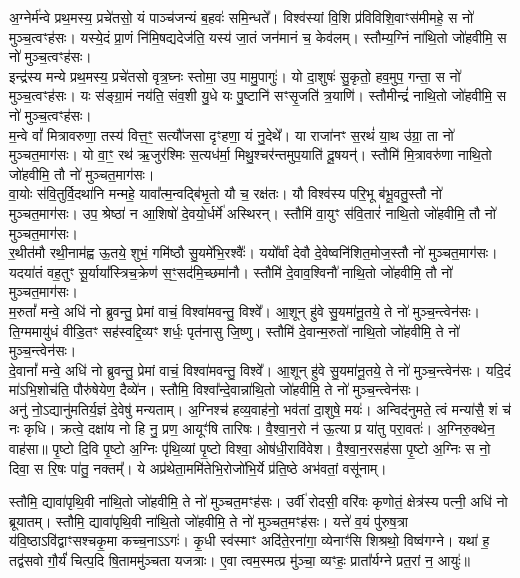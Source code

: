 अ॒ग्नेर्म॑न्वे प्रथ॒मस्य॒ प्रचे॑तसो॒ यं पाञ्च॑जन्यं ब॒हवः॑ समि॒न्धते᳚। विश्व॑स्यां वि॒शि प्र॑विविशि॒वाꣳस॑मीमहे॒ स नो॑ मुञ्च॒त्वꣳह॑सः। यस्ये॒दं प्रा॒णं नि॑मि॒षद्यदेज॑ति॒ यस्य॑ जा॒तं जन॑मानं च॒ केव॑लम्। स्तौम्य॒ग्निं ना॑थि॒तो जो॑हवीमि॒ स नो॑ मुञ्च॒त्वꣳह॑सः।\\
इन्द्र॑स्य मन्ये प्रथ॒मस्य॒ प्रचे॑तसो वृत्र॒घ्नः स्तोमा॒ उप॒ मामु॒पागुः॑। यो दा॒शुषः॑ सु॒कृतो॒ हव॒मुप॒ गन्ता॒ स नो॑ मुञ्च॒त्वꣳह॑सः। यः स॑ङ्ग्रा॒मं नय॑ति॒ संव॒शी यु॒धे यः पु॒ष्टानि॑ सꣳसृ॒जति॑ त्र॒याणि॑। स्तौमीन्द्रं॑ नाथि॒तो जो॑हवीमि॒ स नो॑ मुञ्च॒त्वꣳह॑सः।\\
म॒न्वे वां᳚ मित्रावरुणा॒ तस्य॑ वित्त॒ꣳ॒ सत्यौ॑जसा दृꣳहणा॒ यं नु॒देथे᳚। या राजा॑नꣳ स॒रथं॑ या॒थ उ॑ग्रा॒ ता नो॑ मुञ्चत॒माग॑सः। यो वा॒ꣳ॒ रथ॑ ऋ॒जुर॑श्मिः स॒त्यध॑र्मा॒ मिथु॒श्चर॑न्तमुप॒याति॑ दू॒षयन्॑। स्तौमि॑ मि॒त्रावरु॑णा नाथि॒तो जो॑हवीमि॒ तौ नो॑ मुञ्चत॒माग॑सः।\\
वा॒योः स॑वि॒तुर्वि॒दथा॑नि मन्महे॒ यावा᳚त्म॒न्वद्बि॑भृ॒तो यौ च॒ रक्ष॑तः। यौ विश्व॑स्य परि॒भू ब॑भू॒वतु॒स्तौ नो॑ मुञ्चत॒माग॑सः। उप॒ श्रेष्ठा॑ न आ॒शिषो॑ दे॒वयो॒र्धर्मे॑ अस्थिरन्। स्तौमि॑ वा॒युꣳ स॑वि॒तारं॑ नाथि॒तो जो॑हवीमि॒ तौ नो॑ मुञ्चत॒माग॑सः।\\
र॒थीत॑मौ रथी॒नाम॑ह्व ऊ॒तये॒ शुभं॒ गमि॑ष्ठौ सु॒यमे॑भि॒रश्वैः᳚। ययो᳚र्वां देवौ दे॒वेष्वनि॑शित॒मोज॒स्तौ नो॑ मुञ्चत॒माग॑सः। यदया॑तं वह॒तुꣳ सू॒र्याया᳚स्त्रिच॒क्रेण॑ स॒ꣳ॒सद॑मि॒च्छमा॑नौ। स्तौमि॑ दे॒वाव॒श्विनौ॑ नाथि॒तो जो॑हवीमि॒ तौ नो॑ मुञ्चत॒माग॑सः।\\
म॒रुतां᳚ मन्वे॒ अधि॑ नो ब्रुवन्तु॒ प्रेमां वाचं॒ विश्वा॑मवन्तु॒ विश्वे᳚। आ॒शून् हु॑वे सु॒यमा॑नू॒तये॒ ते नो॑ मुञ्च॒न्त्वेन॑सः। ति॒ग्ममायु॑धं वीडि॒तꣳ सह॑स्वद्दि॒व्यꣳ शर्धः॒ पृत॑नासु जि॒ष्णु। स्तौमि॑ दे॒वान्म॒रुतो॑ नाथि॒तो जो॑हवीमि॒ ते नो॑ मुञ्च॒न्त्वेन॑सः।\\
दे॒वानां᳚ मन्वे॒ अधि॑ नो ब्रुवन्तु॒ प्रेमां वाचं॒ विश्वा॑मवन्तु॒ विश्वे᳚। आ॒शून् हु॑वे सु॒यमा॑नू॒तये॒ ते नो॑ मुञ्च॒न्त्वेन॑सः। यदि॒दं मा॑ऽभि॒शोच॑ति॒ पौरु॑षेयेण॒ दैव्ये॑न। स्तौमि॒ विश्वा᳚न्दे॒वान्ना॑थि॒तो जो॑हवीमि॒ ते नो॑ मुञ्च॒न्त्वेन॑सः।\\
अनु॑ नो॒ऽद्यानु॑मतिर्य॒ज्ञं दे॒वेषु॑ मन्यताम्। अ॒ग्निश्च॑ हव्य॒वाह॑नो॒ भव॑तां दा॒शुषे॒ मयः॑। अन्विद॑नुमते॒ त्वं मन्या॑सै॒ शं च॑ नः कृधि। क्रत्वे॒ दक्षा॑य नो हि नु॒ प्रण॒ आयूꣳ॑षि तारिषः।
वै॒श्वा॒न॒रो न॑ ऊ॒त्या प्र या॑तु  परा॒वतः॑। अ॒ग्निरु॒क्थेन॒ वाह॑सा॥
पृ॒ष्टो दि॒वि पृ॒ष्टो अ॒ग्निः पृ॑थि॒व्यां पृ॒ष्टो विश्वा॒ ओष॑धी॒रावि॑वेश। वै॒श्वा॒न॒रसह॑सा पृ॒ष्टो अ॒ग्निः स नो॒ दिवा॒ स रि॒षः पा॑तु॒ नक्तम्᳚।  ये अप्र॑थेता॒ममि॑तेभि॒रोजो॑भि॒र्ये प्र॑ति॒ष्ठे अभ॑वतां॒ वसू॑नाम्। 

स्तौमि॒ द्यावा॑पृथि॒वी ना॑थि॒तो जो॑हवीमि॒ ते नो॑ मुञ्चत॒मꣳह॑सः। उर्वी॑ रोदसी॒ वरि॑वः कृणोतं॒ क्षेत्र॑स्य पत्नी॒ अधि॑ नो ब्रूयातम्। 
स्तौमि॒ द्यावा॑पृथि॒वी ना॑थि॒तो जो॑हवीमि॒ ते नो॑ मुञ्चत॒मꣳह॑सः। यत्ते॑ व॒यं पु॑रुष॒त्रा य॑वि॒ष्ठाऽवि॑द्वाꣳसश्चकृ॒मा कच्च॒नाऽऽगः॑। 
कृ॒धी स्व॑स्माꣳ अदि॑ते॒रना॑गा॒ व्येनाꣳ॑सि शिश्रथो॒ विष्व॑गग्ने। यथा॑ ह॒ तद्व॑सवो गौ॒र्यं॑ चित्प॒दि षि॒ताममु॑ञ्चता यजत्राः। ए॒वा त्वम॒स्मत्प्र मु॑ञ्चा॒ व्यꣳहः॒ प्राता᳚र्यग्ने प्रत॒रां न॒ आयुः॑॥


